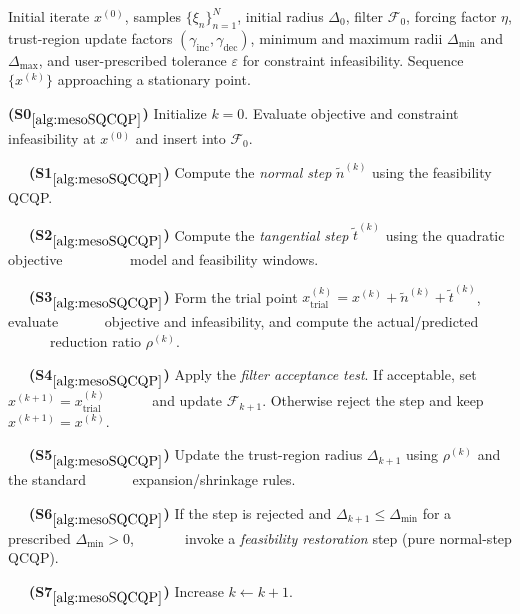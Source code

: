 \documentclass{article}
\newcommand{\1}{\mathds{1}}          %
\def\spc{~~~}
\theoremstyle{definition}
\begin{document}
\begin{sloppypar}
\begin{algorithm}[H]
\caption{Sequential QCQP Filter Trust-Region Method for Meso-Scale ADP-MPC}
\label{alg:mesoSQCQP}
\begin{algorithmic}
\Require Initial iterate $x^{(0)}$, samples $\{\xi_n\}_{n=1}^N$, 
initial radius $\Delta_0$, filter $\mathcal{F}_0$, 
forcing factor $\eta$, trust-region update factors 
$(\gamma_{\mathrm{inc}},\gamma_{\mathrm{dec}})$, 
minimum and maximum radii $\Delta_{\min}$ and $\Delta_{\max}$, and user-prescribed tolerance $\varepsilon$ for constraint infeasibility.
\Ensure Sequence $\{x^{(k)}\}$ approaching a stationary point.

\Statex \textbf{(S0$_{\ref{alg:mesoSQCQP}}$)}  
Initialize $k=0$. 
Evaluate objective and constraint infeasibility at $x^{(0)}$ and insert into $\mathcal{F}_0$.


    \Statex \spc \textbf{(S1$_{\ref{alg:mesoSQCQP}}$)}  
    Compute the \emph{normal step} $\tilde n^{(k)}$ using the feasibility QCQP.
    
    \Statex  \spc\textbf{(S2$_{\ref{alg:mesoSQCQP}}$)}  
    Compute the \emph{tangential step} $\tilde t^{(k)}$ using the quadratic objective  
    \State  \spc \spc \spc  model and feasibility windows.
    
    \Statex  \spc\textbf{(S3$_{\ref{alg:mesoSQCQP}}$)}  
    Form the trial point  
    $x^{(k)}_{\mathrm{trial}} = x^{(k)} + \tilde n^{(k)} + \tilde t^{(k)}$,  
    evaluate 
    \State \spc \spc  objective and infeasibility, and compute the actual/predicted \State \spc \spc reduction ratio $\rho^{(k)}$.

    \Statex  \spc\textbf{(S4$_{\ref{alg:mesoSQCQP}}$)}  
    Apply the \emph{filter acceptance test}.  
    If acceptable, set $x^{(k+1)} = x^{(k)}_{\mathrm{trial}}$ 
    \State \spc \spc and update $\mathcal{F}_{k+1}$.  
    Otherwise reject the step and keep $x^{(k+1)} = x^{(k)}$.

    \Statex  \spc\textbf{(S5$_{\ref{alg:mesoSQCQP}}$)}  
    Update the trust-region radius $\Delta_{k+1}$ using $\rho^{(k)}$ and 
    the standard \State \spc \spc expansion/shrinkage rules.

    \Statex  \spc \textbf{(S6$_{\ref{alg:mesoSQCQP}}$)}  
    If the step is rejected and $\Delta_{k+1}\le\Delta_{\min}$ for a prescribed
$\Delta_{\min}>0$, 
    \State \spc \spc
    invoke a  \emph{feasibility restoration} step (pure normal-step QCQP).

    \Statex  \spc\textbf{(S7$_{\ref{alg:mesoSQCQP}}$)}  
    Increase $k \leftarrow k+1$.


\end{algorithmic}
\end{algorithm}
\end{sloppypar}
\end{document}
